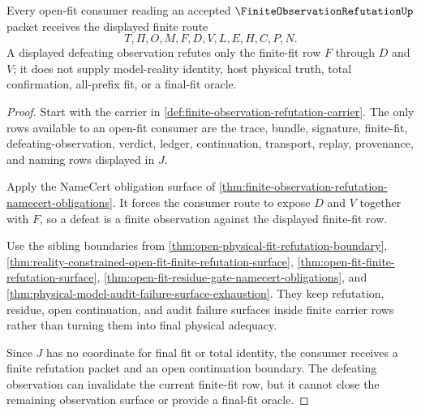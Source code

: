\begin{theorem}
\label{thm:finite-observation-refutation-open-fit-consumer}
Every open-fit consumer reading an accepted $\FiniteObservationRefutationUp$ packet receives the displayed finite route
$$
T,\Pi,O,M,F,D,V,L,E,H,C,P,N.
$$
A displayed defeating observation refutes only the finite-fit row $F$ through $D$ and $V$; it does not supply model-reality identity, host physical truth, total confirmation, all-prefix fit, or a final-fit oracle.
\end{theorem}
\begin{proof}
Start with the carrier in \autoref{def:finite-observation-refutation-carrier}. The only rows available to an open-fit consumer are the trace, bundle, signature, finite-fit, defeating-observation, verdict, ledger, continuation, transport, replay, provenance, and naming rows displayed in $J$.

Apply the NameCert obligation surface of \autoref{thm:finite-observation-refutation-namecert-obligations}. It forces the consumer route to expose $D$ and $V$ together with $F$, so a defeat is a finite observation against the displayed finite-fit row.

Use the sibling boundaries from \autoref{thm:open-physical-fit-refutation-boundary}, \autoref{thm:reality-constrained-open-fit-finite-refutation-surface}, \autoref{thm:open-fit-finite-refutation-surface}, \autoref{thm:open-fit-residue-gate-namecert-obligations}, and \autoref{thm:physical-model-audit-failure-surface-exhaustion}. They keep refutation, residue, open continuation, and audit failure surfaces inside finite carrier rows rather than turning them into final physical adequacy.

Since $J$ has no coordinate for final fit or total identity, the consumer receives a finite refutation packet and an open continuation boundary. The defeating observation can invalidate the current finite-fit row, but it cannot close the remaining observation surface or provide a final-fit oracle.
\end{proof}

